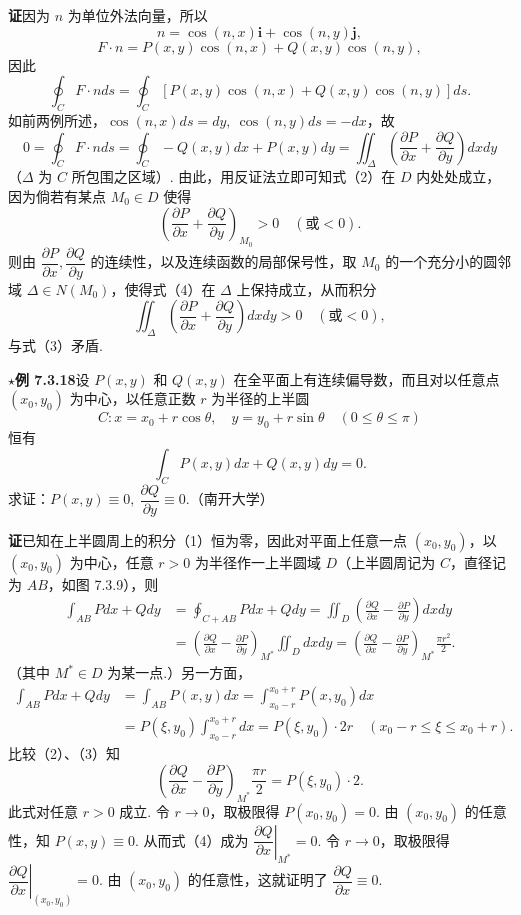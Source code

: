 \documentclass[UTF8,12pt,a4paper,fontset=fandol]{ctexart}
\begin{document}
\noindent\textbf{证}\quad 因为 $n$ 为单位外法向量，所以
\[
n=\cos(n,x)\boldsymbol i+\cos(n,y)\boldsymbol j,
\]
\[
F\cdot n=P(x,y)\cos(n,x)+Q(x,y)\cos(n,y),
\]
因此
\[
\oint_CF\cdot nds
=\oint_C[P(x,y)\cos(n,x)+Q(x,y)\cos(n,y)]ds.
\]
如前两例所述，$\cos(n,x)ds=dy,\ \cos(n,y)ds=-dx$，故
\[
0=\oint_CF\cdot nds=\oint_C-Q(x,y)dx+P(x,y)dy
=\iint_\Delta\left(\frac{\partial P}{\partial x}
+\frac{\partial Q}{\partial y}\right)dxdy \tag{3}
\]
（$\Delta$ 为 $C$ 所包围之区域）.
由此，用反证法立即可知式（2）在 $D$ 内处处成立，因为倘若有某点 $M_0\in D$ 使得
\[
\left(\frac{\partial P}{\partial x}+\frac{\partial Q}{\partial y}\right)_{M_0}>0
\quad(\text{或}<0). \tag{4}
\]
则由 $\dfrac{\partial P}{\partial x},\dfrac{\partial Q}{\partial y}$ 的连续性，以及连续函数的局部保号性，取 $M_0$ 的一个充分小的圆邻域 $\Delta\in N(M_0)$，使得式（4）在 $\Delta$ 上保持成立，从而积分
\[
\iint_\Delta\left(\frac{\partial P}{\partial x}
+\frac{\partial Q}{\partial y}\right)dxdy>0\quad(\text{或}<0),
\]
与式（3）矛盾.

\noindent\textbf{$\star$例 7.3.18}\quad 设 $P(x,y)$ 和 $Q(x,y)$ 在全平面上有连续偏导数，而且对以任意点 $(x_0,y_0)$ 为中心，以任意正数 $r$ 为半径的上半圆
\[
C:x=x_0+r\cos\theta,\quad y=y_0+r\sin\theta\quad(0\le\theta\le\pi)
\]
恒有
\[
\int_CP(x,y)dx+Q(x,y)dy=0. \tag{1}
\]
求证：$P(x,y)\equiv0,\ \dfrac{\partial Q}{\partial y}\equiv0$.（南开大学）

\noindent\textbf{证}\quad 已知在上半圆周上的积分（1）恒为零，因此对平面上任意一点 $(x_0,y_0)$，以 $(x_0,y_0)$ 为中心，任意 $r>0$ 为半径作一上半圆域 $D$（上半圆周记为 $C$，直径记为 $AB$，如图 7.3.9），则
\begin{equation}
\begin{aligned}
\int_{AB}Pdx+Qdy
&=\oint_{C+AB}Pdx+Qdy
=\iint_D\left(\frac{\partial Q}{\partial x}
-\frac{\partial P}{\partial y}\right)dxdy\\
&=\left(\frac{\partial Q}{\partial x}
-\frac{\partial P}{\partial y}\right)_{M^*}\iint_Ddxdy
=\left(\frac{\partial Q}{\partial x}
-\frac{\partial P}{\partial y}\right)_{M^*}\frac{\pi r^2}{2}.
\end{aligned}
\tag{2}
\end{equation}
（其中 $M^*\in D$ 为某一点.）另一方面，
\begin{equation}
\begin{aligned}
\int_{AB}Pdx+Qdy
&=\int_{AB}P(x,y)dx
=\int_{x_0-r}^{x_0+r}P(x,y_0)dx\\
&=P(\xi,y_0)\int_{x_0-r}^{x_0+r}dx
=P(\xi,y_0)\cdot2r\quad(x_0-r\le\xi\le x_0+r).
\end{aligned}
\tag{3}
\end{equation}
比较（2）、（3）知
\[
\left(\frac{\partial Q}{\partial x}
-\frac{\partial P}{\partial y}\right)_{M^*}\frac{\pi r}{2}
=P(\xi,y_0)\cdot2. \tag{4}
\]
此式对任意 $r>0$ 成立. 令 $r\to0$，取极限得 $P(x_0,y_0)=0$. 由 $(x_0,y_0)$ 的任意性，知 $P(x,y)\equiv0$. 从而式（4）成为 $\left.\dfrac{\partial Q}{\partial x}\right|_{M^*}=0$. 令 $r\to0$，取极限得 $\left.\dfrac{\partial Q}{\partial x}\right|_{(x_0,y_0)}=0$. 由 $(x_0,y_0)$ 的任意性，这就证明了 $\dfrac{\partial Q}{\partial x}\equiv0$.
\end{document}
